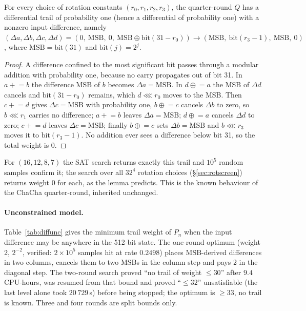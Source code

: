 \documentclass{iacrtrans}
\newcommand{\ChaCha}{\textsf{ChaCha}\xspace}
\newcommand{\PP}[1]{P_{#1}}
\newcommand{\rotl}{\lll}
\newcommand{\WuncTwo}{33}    %
\begin{document}
\begin{lemma}
\label{lem:msb}
For every choice of rotation constants $(r_0,r_1,r_2,r_3)$, the quarter-round $Q$ has a differential trail of probability one (hence a differential of probability one) with a nonzero input difference, namely
$(\Delta a,\Delta b,\Delta c,\Delta d) = (0,\ \mathrm{MSB},\ 0,\ \mathrm{MSB}\oplus \mathrm{bit}(31-r_0)) \to (\mathrm{MSB},\ \mathrm{bit}(r_3-1),\ \mathrm{MSB},\ 0)$, where $\mathrm{MSB} = \mathrm{bit}(31)$ and $\mathrm{bit}(j) = 2^j$.
\end{lemma}
\begin{proof}
A difference confined to the most significant bit passes through a modular addition with probability one, because no carry propagates out of bit 31. In $a \mathrel{+}= b$ the difference $\mathrm{MSB}$ of $b$ becomes $\Delta a = \mathrm{MSB}$. In $d \mathrel{\oplus}= a$ the MSB of $\Delta d$ cancels and $\mathrm{bit}(31-r_0)$ remains, which $d \rotl r_0$ moves to the MSB. Then $c \mathrel{+}= d$ gives $\Delta c = \mathrm{MSB}$ with probability one, $b \mathrel{\oplus}= c$ cancels $\Delta b$ to zero, so $b \rotl r_1$ carries no difference; $a \mathrel{+}= b$ leaves $\Delta a = \mathrm{MSB}$; $d \mathrel{\oplus}= a$ cancels $\Delta d$ to zero; $c \mathrel{+}= d$ leaves $\Delta c = \mathrm{MSB}$; finally $b \mathrel{\oplus}= c$ sets $\Delta b = \mathrm{MSB}$ and $b \rotl r_3$ moves it to $\mathrm{bit}(r_3-1)$. No addition ever sees a difference below bit 31, so the total weight is 0.
\end{proof}
For $(16,12,8,7)$ the SAT search returns exactly this trail and $10^5$ random samples confirm it; the search over all $32^4$ rotation choices (\S\ref{sec:rotscreen}) returns weight 0 for each, as the lemma predicts. This is the known behaviour of the \ChaCha quarter-round, inherited unchanged.

\paragraph{Unconstrained model.} Table~\ref{tab:diffunc} gives the minimum trail weight of $\PP{n}$ when the input difference may be anywhere in the 512-bit state. The one-round optimum (weight 2, $2^{-2}$, verified: $2\times10^5$ samples hit at rate $0.2498$) places MSB-derived differences in two columns, cancels them to two MSBs in the column step and pays 2 in the diagonal step. The two-round search proved ``no trail of weight $\leq 30$'' after $9.4$ CPU-hours, was resumed from that bound and proved ``$\leq 32$'' unsatisfiable (the last level alone took $20\,729$\,s) before being stopped; the optimum is $\geq \WuncTwo$, no trail is known. Three and four rounds are split bounds only.
\end{document}
